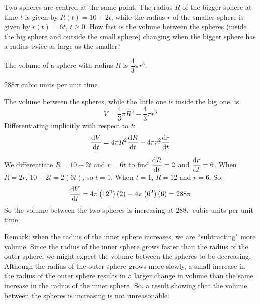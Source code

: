 \begin{question}
Two spheres are centred at the same point. The radius $R$ of the bigger sphere at time $t$ is given by $R(t)=10+2t$, while the radius $r$ of the smaller sphere is given by $r(t)=6t$, $t \ge 0$. How fast is the volume between the spheres (inside the big sphere and outside the small sphere) changing when the bigger sphere has a radius twice as large as the smaller?
\end{question}
\begin{hint}
The volume of a sphere with radius $R$ is $\dfrac{4}{3}\pi r^3$.
\end{hint}
\begin{answer}
$288 \pi$ cubic units per unit time
\end{answer}
\begin{solution}
The volume between the spheres, while the little one is inside the big one, is
\[V=\frac{4}{3}\pi R^3 - \frac{4}{3}\pi r^3\]
Differentiating implicitly with respect to $t$:
\[\diff{V}{t}=4\pi R^2\diff{R}{t}-4\pi r^2\diff{r}{t}\]

We differentiate $R=10+2t$ and $r=6t$ to find $\ds\diff{R}{t}=2$ and $\ds\diff{r}{t}=6$. When $R=2r$, $10+2t=2(6t)$, so $t=1$. When $t=1$, $R=12$ and $r=6$. So:
\[\diff{V}{t}=4\pi\left(12^2\right)(2)-4\pi\left(6^2\right)(6)=288\pi\]
So the volume between the two spheres is increasing at $288\pi$ cubic units per unit time.

Remark: when the radius of the inner sphere increases, we are ``subtracting" more volume. Since the radius of the inner sphere grows faster than the radius of the outer sphere, we might expect the volume between the spheres to be decreasing. Although the radius of the outer sphere grows more slowly, a small increase in the radius of the outer sphere results in a larger change in volume than the same increase in the radius of the inner sphere. So, a result showing that the volume between the spheres is increasing is not unreasonable.
\end{solution}



